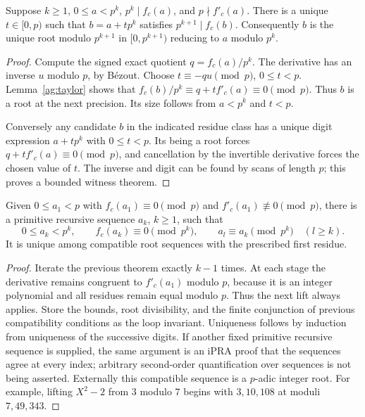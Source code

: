 \begin{theorem}\label{ag:henselstep}
Suppose $k\ge1$, $0\le a<p^k$, $p^k\mid f_c(a)$, and $p\nmid f'_c(a)$. There is a unique $t\in[0,p)$ such that $b=a+t p^k$ satisfies $p^{k+1}\mid f_c(b)$. Consequently $b$ is the unique root modulo $p^{k+1}$ in $[0,p^{k+1})$ reducing to $a$ modulo $p^k$.
\end{theorem}
\begin{proof}
Compute the signed exact quotient $q=f_c(a)/p^k$. The derivative has an inverse $u$ modulo $p$, by B\'ezout. Choose $t\equiv-qu\pmod p$, $0\le t<p$. Lemma~\ref{ag:taylor} shows that $f_c(b)/p^k\equiv q+t f'_c(a)\equiv0\pmod p$. Thus $b$ is a root at the next precision. Its size follows from $a<p^k$ and $t<p$.

Conversely any candidate $b$ in the indicated residue class has a unique digit expression $a+t p^k$ with $0\le t<p$. Its being a root forces $q+t f'_c(a)\equiv0\pmod p$, and cancellation by the invertible derivative forces the chosen value of $t$. The inverse and digit can be found by scans of length $p$; this proves a bounded witness theorem.
\end{proof}

\begin{theorem}\label{ag:henselname}
Given $0\le a_1<p$ with $f_c(a_1)\equiv0\pmod p$ and $f'_c(a_1)\not\equiv0\pmod p$, there is a primitive recursive sequence $a_k$, $k\ge1$, such that
\[
 0\le a_k<p^k,\qquad f_c(a_k)\equiv0\pmod{p^k},\qquad
 a_l\equiv a_k\pmod{p^k}\quad(l\ge k).
\]
It is unique among compatible root sequences with the prescribed first residue.
\end{theorem}
\begin{proof}
Iterate the previous theorem exactly $k-1$ times. At each stage the derivative remains congruent to $f'_c(a_1)$ modulo $p$, because it is an integer polynomial and all residues remain equal modulo $p$. Thus the next lift always applies. Store the bounds, root divisibility, and the finite conjunction of previous compatibility conditions as the loop invariant. Uniqueness follows by induction from uniqueness of the successive digits. If another fixed primitive recursive sequence is supplied, the same argument is an iPRA proof that the sequences agree at every index; arbitrary second-order quantification over sequences is not being asserted. Externally this compatible sequence is a $p$-adic integer root. For example, lifting $X^2-2$ from $3$ modulo $7$ begins with $3,10,108$ at moduli $7,49,343$.
\end{proof}

